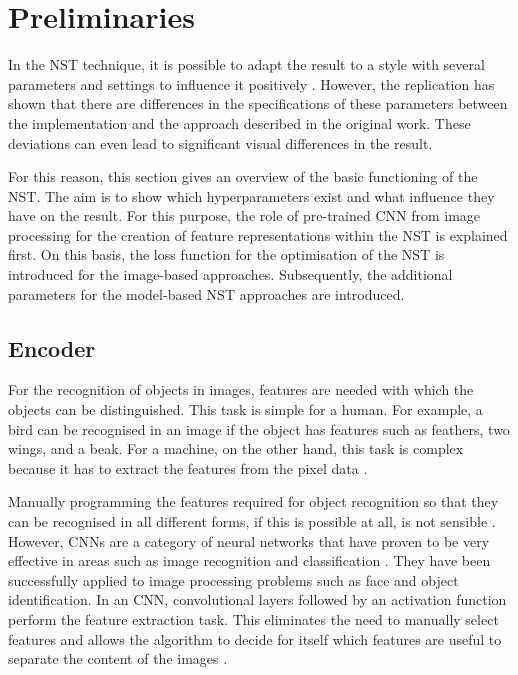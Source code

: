 \section{Preliminaries} \label{sec:preliminaries}
In the \gls{NST} technique, it is possible to adapt the result to a style with several parameters and settings to influence it positively \cite{GEB2016}. However, the replication has shown that there are differences in the specifications of these parameters between the implementation and the approach described in the original work. These deviations can even lead to significant visual differences in the result. 

For this reason, this section gives an overview of the basic functioning of the \gls{NST}. The aim is to show which hyperparameters exist and what influence they have on the result. For this purpose, the role of pre-trained \gls{CNN} from image processing for the creation of feature representations within the \gls{NST} is explained first. On this basis, the loss function for the optimisation of the \gls{NST} is introduced for the image-based approaches. Subsequently, the additional parameters for the model-based \gls{NST} approaches are introduced. 

\subsection{Encoder} \label{sec:encoder}
For the recognition of objects in images, features are needed with which the objects can be distinguished. This task is simple for a human. For example, a bird can be recognised in an image if the object has features such as feathers, two wings, and a beak. For a machine, on the other hand, this task is complex because it has to extract the features from the pixel data \cite{Alp2020}. 

Manually programming the features required for object recognition so that they can be recognised in all different forms, if this is possible at all, is not sensible \cite{Alp2020}. However, \glspl{CNN} are a category of neural networks that have proven to be very effective in areas such as image recognition and classification \cite{SZ2015,He2016}. They have been successfully applied to image processing problems such as face and object identification. In an \gls{CNN}, convolutional layers followed by an activation function perform the feature extraction task. This eliminates the need to manually select features and allows the algorithm to decide for itself which features are useful to separate the content of the images \cite{Alp2020}. 

